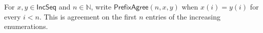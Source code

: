 \begin{definition}
For $x,y\in\mathsf{IncSeq}$ and $n\in\mathbb N$, write
$\mathsf{PrefixAgree}(n,x,y)$ when $x(i)=y(i)$ for every $i<n$.  This is
agreement on the first $n$ entries of the increasing enumerations.
\end{definition}
